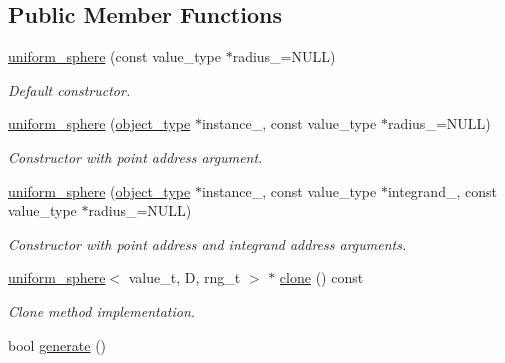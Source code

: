 \subsection*{Public Member Functions}
\begin{DoxyCompactItemize}
\item 
\hypertarget{a00566_a9611c8dc0eb531fbd583e438cd03be24}{}\hyperlink{a00566_a9611c8dc0eb531fbd583e438cd03be24}{uniform\+\_\+sphere} (const value\+\_\+type $\ast$radius\+\_\+=N\+U\+L\+L)\label{a00566_a9611c8dc0eb531fbd583e438cd03be24}

\begin{DoxyCompactList}\small\item\em Default constructor. \end{DoxyCompactList}\item 
\hypertarget{a00566_ac865601a1d2ab995fd8a2aef2b67f456}{}\hyperlink{a00566_ac865601a1d2ab995fd8a2aef2b67f456}{uniform\+\_\+sphere} (\hyperlink{a00579}{object\+\_\+type} $\ast$instance\+\_\+, const value\+\_\+type $\ast$radius\+\_\+=N\+U\+L\+L)\label{a00566_ac865601a1d2ab995fd8a2aef2b67f456}

\begin{DoxyCompactList}\small\item\em Constructor with point address argument. \end{DoxyCompactList}\item 
\hypertarget{a00566_ab46b304a49f9b75debdb490a6147b702}{}\hyperlink{a00566_ab46b304a49f9b75debdb490a6147b702}{uniform\+\_\+sphere} (\hyperlink{a00579}{object\+\_\+type} $\ast$instance\+\_\+, const value\+\_\+type $\ast$integrand\+\_\+, const value\+\_\+type $\ast$radius\+\_\+=N\+U\+L\+L)\label{a00566_ab46b304a49f9b75debdb490a6147b702}

\begin{DoxyCompactList}\small\item\em Constructor with point address and integrand address arguments. \end{DoxyCompactList}\item 
\hypertarget{a00566_af1681938ef57701d3c1ed88a3b28bc3a}{}\hyperlink{a00566}{uniform\+\_\+sphere}$<$ value\+\_\+t, D, rng\+\_\+t $>$ $\ast$ \hyperlink{a00566_af1681938ef57701d3c1ed88a3b28bc3a}{clone} () const \label{a00566_af1681938ef57701d3c1ed88a3b28bc3a}

\begin{DoxyCompactList}\small\item\em Clone method implementation. \end{DoxyCompactList}\item 
\hypertarget{a00566_a229e39ea995845bd2e381143502deb43}{}bool \hyperlink{a00566_a229e39ea995845bd2e381143502deb43}{generate} ()\label{a00566_a229e39ea995845bd2e381143502deb43}


\end{DoxyCompactItemize}

